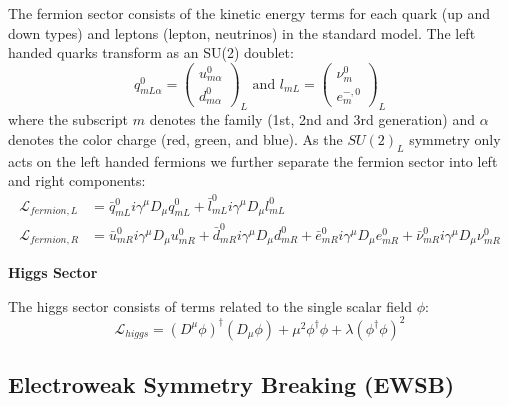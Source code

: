 The fermion sector consists of the kinetic energy terms for each quark (up and down types) and leptons (lepton, neutrinos) in the standard model.
The left handed quarks transform as an SU(2) doublet:
\begin{equation}
q^0_{mL\alpha} = \left( \begin{array}{c} u_{m\alpha}^0  \\ d_{m\alpha}^0 \end{array} \right)_L \text{ and } l_{mL} = \left( \begin{array}{c} \nu_{m}^0  \\ e^{-,0}_{m} \end{array} \right)_L 
\end{equation}
where the subscript $m$ denotes the family (1st, 2nd and 3rd generation) and $\alpha$ denotes the color charge (red, green, and blue).
As the $SU(2)_L$ symmetry only acts on the left handed fermions we further separate the fermion sector into left and right components:
\begin{align*}
\mathcal{L}_{fermion,L} &= \bar{q}^0_{mL} i \gamma^\mu D_\mu q^0_{mL} + \bar{l}^0_{mL} i \gamma^\mu D_\mu l^0_{mL}\\
\mathcal{L}_{fermion,R} &=  \bar{u}^0_{mR} i \gamma^\mu D_\mu u^0_{mR} 
+ \bar{d}^0_{mR} i \gamma^\mu D_\mu d^0_{mR} + \bar{e}^0_{mR} i \gamma^\mu D_\mu e^0_{mR} + \bar{\nu}^0_{mR} i \gamma^\mu D_\mu \nu^0_{mR}
\end{align*}

\textbf{Higgs Sector}

The higgs sector consists of terms related to the single scalar field $\phi$:
\begin{equation}
\mathcal{L}_{higgs} = (D^\mu \phi)^\dagger(D_\mu \phi) + \mu^2 \phi^\dagger \phi + \lambda (\phi^\dagger \phi)^2 
\end{equation}

\subsection{Electroweak Symmetry Breaking (EWSB)}

